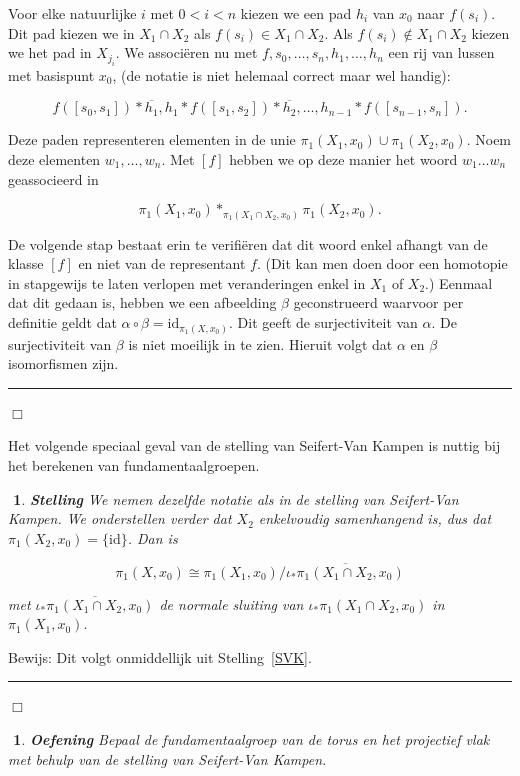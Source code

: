 \documentclass[12pt]{book}
\newcommand{\bew}{{\sc Bewijs: }}
\newcommand{\B}{\rule{1mm}{0mm} \hfill $\Box$ }
\newcommand{\id}{\mbox{id}}
\newtheorem{stelh}{$\!\!$}[section]
\newenvironment{stel}{\begin{stelh}{\em {\bf Stelling }}}{\end{stelh}}
\newtheorem{eoef}{$\!\!$}[chapter]
\newenvironment{oef}{\begin{eoef} {\bf Oefening}}{\end{eoef}}
\begin{document}
Voor elke natuurlijke $i$ met $0<i<n$ kiezen we een pad $h_i$ van $x_0$ naar $f(s_i)$. Dit pad kiezen we in
$X_1\cap X_2$ als $f(s_i)\in X_1\cap X_2$. Als $f(s_i)\not\in X_1\cap X_2$  kiezen we het pad in
$X_{j_{i}}$.  We associ\"eren nu met $f, s_0, \ldots ,s_n, h_1, \ldots , h_n$ een rij van lussen met basispunt $x_0$, (de notatie is niet helemaal correct maar wel handig):

$$f([s_0,s_1]) * \overline{h_{1}} ,h_1 *f([s_1,s_2]) * \overline{h_{2}}, \ldots , h_{n-1} * f([s_{n-1}, s_n]).$$

Deze paden representeren elementen in de unie $\pi_{1}(X_1,x_0)\cup \pi_{1}(X_2, x_0)$. Noem deze elementen
$w_1, \ldots , w_n$. Met $[f]$ hebben we op deze manier het woord $w_1\ldots w_n$ geassocieerd in

$$\pi_{1}(X_1, x_0)\ast_{\pi_{1}(X_1\cap X_2, x_0)}\pi_{1}(X_2, x_0).$$

De volgende stap bestaat erin te  verifi\"eren dat dit woord enkel afhangt van de klasse $[f]$ en niet van de
representant $f$. (Dit kan men doen door een homotopie in stapgewijs te laten verlopen met veranderingen enkel in $X_1$ of $X_2$.) Eenmaal dat dit gedaan is, hebben we een afbeelding $\beta$ geconstrueerd waarvoor per definitie geldt dat
$\alpha\circ \beta=\mbox{id}_{\pi_{1}(X,x_{0})}$. 
Dit geeft de surjectiviteit van $\alpha$. De surjectiviteit van $\beta$
is niet  moeilijk in te zien. Hieruit volgt dat $\alpha$ en $\beta$ isomorfismen zijn.
\B

Het volgende speciaal geval van de stelling van Seifert-Van Kampen is nuttig bij het berekenen
van fundamentaalgroepen.

\begin{stel} \label{SVKspec}
We nemen dezelfde notatie als in de stelling van Seifert-Van Kampen. We onderstellen verder dat
$X_2$ enkelvoudig samenhangend is, dus dat $\pi_{1}(X_{2},x_0)= \{\id\}$.
Dan is

$$\pi_{1}(X,x_0)\cong \pi_{1}(X_1, x_0)/\overline{\iota_{*}\pi_{1}(X_1\cap X_2, x_0)}$$

met $\overline{\iota_{*}\pi_{1}(X_1\cap X_2, x_0)}$ de normale sluiting van $\iota_{*}\pi_{1}(X_1\cap X_2, x_0)$ in $\pi_{1}(X_1,x_0)$.
\end{stel}

\bew Dit volgt onmiddellijk uit Stelling~\ref{SVK}. \B


\begin{oef}
Bepaal de fundamentaalgroep van de torus en het projectief vlak met behulp van de stelling van Seifert-Van Kampen.
\end{oef}
\end{document}
